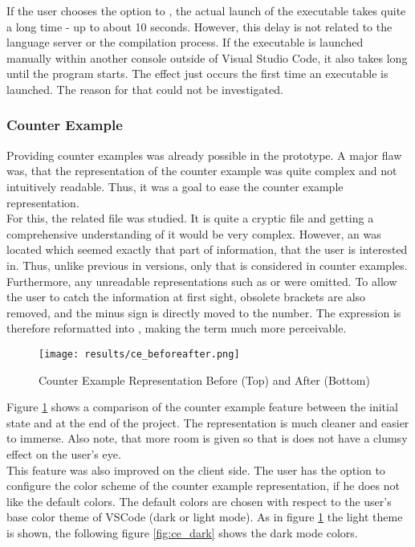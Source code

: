 If the user chooses the option to , the actual launch of the executable takes quite a long time - up to about 10 seconds.
However, this delay is not related to the language server or the compilation process.
If the executable is launched manually within another console outside of Visual Studio Code, it also takes long until the program starts.
The effect just occurs the first time an executable is launched.
The reason for that could not be investigated.

\subsubsection{Counter Example}
Providing counter examples was already possible in the prototype.
A major flaw was, that the representation of the counter example was quite complex and not intuitively readable.
Thus, it was a goal to ease the counter example representation.\\

For this, the related  file was studied.
It is quite a  cryptic file and getting a comprehensive understanding of it would be very complex.
However, an  was located which seemed exactly that part of information, that the user is interested in.
Thus, unlike previous in versions, only that  is considered in counter examples.
Furthermore, any unreadable representations such as  or  were omitted.
To allow the user to catch the information at first sight, obsolete brackets are also removed, and the minus sign is directly moved to the number.
The expression  is therefore reformatted into , making the term much more perceivable.

\begin{figure}[H]
    \centering
    \texttt{[image: results/ce\_beforeafter.png]}
    \caption{Counter Example Representation Before (Top) and After (Bottom)}
    \label{fig:ce_beforeafter}
\end{figure}

Figure \ref{fig:ce_beforeafter} shows a comparison of the counter example feature between the initial state and at the end of the project.
The representation is much cleaner and easier to immerse.
Also note, that more room is given so that is does not have a clumsy effect on the user's eye. \\

This feature was also improved on the client side.
The user has the option to configure the color scheme of the counter example representation, if he does not like the default colors.
The default colors are chosen with respect to the user's base color theme of VSCode (dark or light mode).
As in figure \ref{fig:ce_beforeafter} the light theme is shown,
the following figure \ref{fig:ce_dark} shows the dark mode colors.

